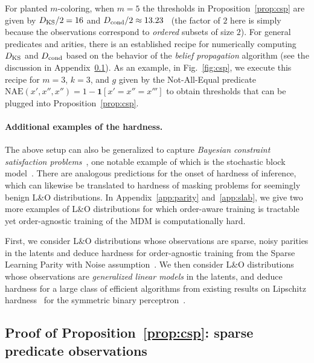 For planted $m$-coloring, when $m = 5$ the thresholds in Proposition~\ref{prop:csp} are given by $D_{\rm KS} / 2 = 16$ and $D_{\rm cond} / 2 \approx 13.23$~\cite{krzakala2009hiding} (the factor of $2$ here is simply because the observations correspond to \emph{ordered} subsets of size $2$). For general predicates and arities, there is an established recipe for numerically computing $D_{\rm KS}$ and $D_{\rm cond}$ based on the behavior of the \emph{belief propagation} algorithm (see the discussion in Appendix~\ref{app:planted_result}). As an example, in Fig.~\ref{fig:csp}, we execute this recipe for $m = 3$, $k = 3$, and $g$ given by the Not-All-Equal predicate $\mathrm{NAE}(x',x'',x'') = 1 - \mathbf{1}[x' = x'' = x''']$ to obtain thresholds that can be plugged into Proposition~\ref{prop:csp}.

\paragraph{Additional examples of the hardness.} The above setup can also be generalized to capture \emph{Bayesian constraint satisfaction problems}~\cite{montanari2008estimating,liu2022statistical}, one notable example of which is the stochastic block model~\cite{PhysRevE.84.066106}. There are analogous predictions for the onset of hardness of inference, which can likewise be translated to hardness of masking problems for seemingly benign L\&O distributions. In Appendix~\ref{app:parity} and~\ref{app:slab}, we give two more examples of L\&O distributions for which order-aware training is tractable yet order-agnostic training of the MDM is computationally hard. 

First, we consider L\&O distributions whose observations are sparse, noisy parities in the latents and deduce hardness for order-agnostic training from the Sparse Learning Parity with Noise assumption~\cite{alekhnovich2003more}. We then consider L\&O distributions whose observations are \emph{generalized linear models} in the latents, and deduce hardness for a large class of efficient algorithms from existing results on Lipschitz hardness~\cite{alaoui2024hardness} for the symmetric binary perceptron~\cite{aubin2019storage}.




\subsection{Proof of Proposition~\ref{prop:csp}: sparse predicate observations}
\label{app:planted_result}

